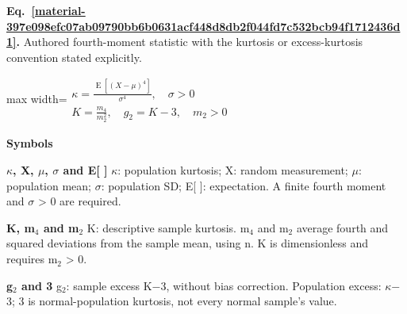 \documentclass[11pt,a4paper]{article}
\begin{document}
\par\medskip
\noindent\begin{minipage}{\linewidth}
\label{material-397e098efc07ab09790bb6b0631acf448d8db2f044fd7c532bcb94f1712436d1}
\noindent\textbf{Eq.~\ref*{material-397e098efc07ab09790bb6b0631acf448d8db2f044fd7c532bcb94f1712436d1}.} Authored fourth-moment statistic with the kurtosis or excess-kurtosis convention stated explicitly.\par\nopagebreak
\begin{center}\begin{adjustbox}{max width=\linewidth}$\displaystyle \begin{gathered}\kappa=\frac{\operatorname{E}[(X-\mu)^4]}{\sigma^4},\quad\sigma>0\\K=\frac{m_4}{m_2^2},\quad g_2=K-3,\quad m_2>0\end{gathered}$\end{adjustbox}\end{center}

\par\noindent\textbf{Symbols}

\par\noindent\textbf{\ensuremath{\kappa}, X, \ensuremath{\mu}, \ensuremath{\sigma} and E[ ]} \ensuremath{\kappa}: population kurtosis; X: random measurement; \ensuremath{\mu}: population mean; \ensuremath{\sigma}: population SD; E[ ]: expectation. A finite fourth moment and \ensuremath{\sigma} > 0 are required.

\par\noindent\textbf{K, m\ensuremath{{}_4} and m\ensuremath{{}_2}} K: descriptive sample kurtosis. m\ensuremath{{}_4} and m\ensuremath{{}_2} average fourth and squared deviations from the sample mean, using n. K is dimensionless and requires m\ensuremath{{}_2} > 0.

\par\noindent\textbf{g\ensuremath{{}_2} and 3} g\ensuremath{{}_2}: sample excess K\ensuremath{-}3, without bias correction. Population excess: \ensuremath{\kappa}\ensuremath{-}3; 3 is normal-population kurtosis, not every normal sample's value.

\end{minipage}\par
\medskip
\end{document}

